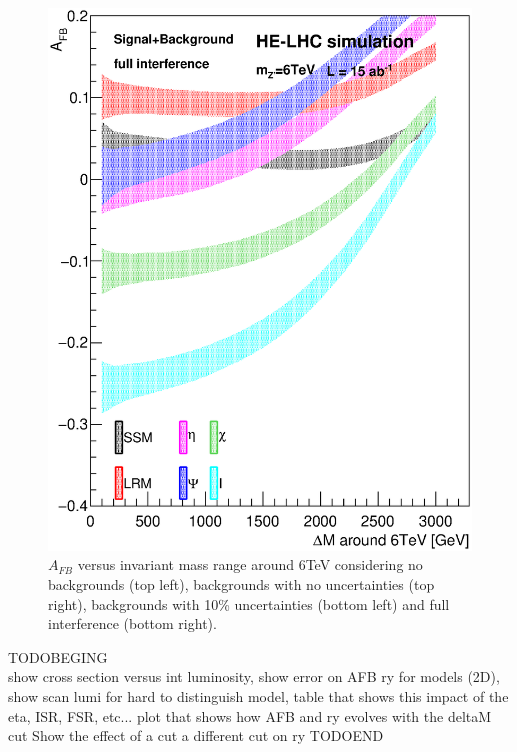 \begin{figure}[!htb]
   \includegraphics[width=0.45\columnwidth]{Fig/27tev/afb_vs_dm_interf.eps}
  \caption{$A_{FB}$ versus invariant mass range around 6TeV considering no backgrounds (top left), backgrounds with no uncertainties (top right), backgrounds with 10\% uncertainties (bottom left) and full interference (bottom right).}
  \label{figure:lepana:afb_dm}
\end{figure}


\label{subsubsection:results}
TODOBEGING\\
show cross section versus int luminosity, show error on AFB ry for models (2D), show scan lumi for hard to distinguish model, table that shows this impact of the eta, ISR, FSR, etc...
plot that shows how AFB and ry evolves with the deltaM cut
Show the effect of a cut a different cut on ry
TODOEND\\

